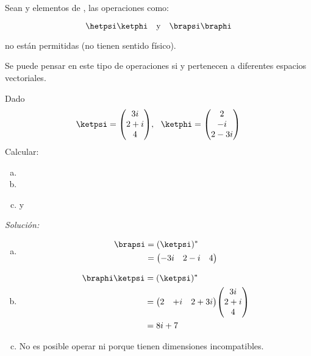          Sean \ketpsi y \ketphi elementos de \hilb, las operaciones como:

         \[
             \hetpsi\ketphi\qq{y}\brapsi\braphi
         \]

         no están permitidas (no tienen sentido físico).

         Se puede pensar en este tipo de operaciones si \ketpsi y \ketphi pertenecen a diferentes espacios vectoriales.

         \begin{example}[Operadores]
             Dado
             \[
                 \ketpsi=\mqty(3i\\2+i\\4),~~\ketphi=\mqty(2\\-i\\2-3i)
             \]
             Calcular:
             \begin{enumerate}[a) ]
                 \item \brapsi
                 \item \braphi\ketpsi
                 \item \ketpsi\ketphi y \brapsi\braphi
             \end{enumerate}

             \textit{Solución:}

             \begin{enumerate}[a) ]
                 \item
                       \begin{align*}
                           \brapsi & =(\ketpsi)^*            \\
                                   & =\mqty(-3i   & 2-i & 4)
                       \end{align*}
                 \item
                       \begin{align*}
                           \braphi\ketpsi & =(\ketpsi)^*                      \\
                                          & =\mqty(2     & +i & 2+3i)\mqty(3i \\2+i\\4)\\
                                          & =8i+7
                       \end{align*}
                 \item No es posible operar \ketpsi\ketphi ni \brapsi\braphi porque tienen dimensiones incompatibles.
             \end{enumerate}
         \end{example}

